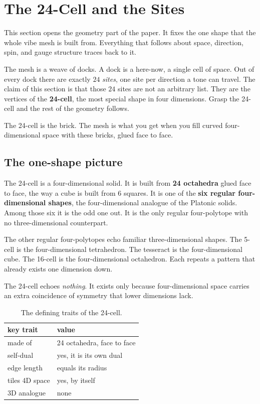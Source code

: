 \section{The 24-Cell and the Sites}

This section opens the geometry part of the paper. It fixes the one shape that the whole vibe mesh is built from. Everything that follows about space, direction, spin, and gauge structure traces back to it.

The mesh is a weave of docks. A dock is a here-now, a single cell of space. Out of every dock there are exactly $24$ \emph{sites}, one site per direction a tone can travel. The claim of this section is that those $24$ sites are not an arbitrary list. They are the vertices of the \textbf{24-cell}, the most special shape in four dimensions. Grasp the 24-cell and the rest of the geometry follows.

\begin{principle}
The 24-cell is the brick. The mesh is what you get when you fill curved four-dimensional space with these bricks, glued face to face.
\end{principle}

\subsection{The one-shape picture}

The 24-cell is a four-dimensional solid. It is built from \textbf{24 octahedra} glued face to face, the way a cube is built from $6$ squares. It is one of the \textbf{six regular four-dimensional shapes}, the four-dimensional analogue of the Platonic solids. Among those six it is the odd one out. It is the only regular four-polytope with no three-dimensional counterpart.

The other regular four-polytopes echo familiar three-dimensional shapes. The 5-cell is the four-dimensional tetrahedron. The tesseract is the four-dimensional cube. The 16-cell is the four-dimensional octahedron. Each repeats a pattern that already exists one dimension down.

The 24-cell echoes \emph{nothing}. It exists only because four-dimensional space carries an extra coincidence of symmetry that lower dimensions lack.

\begin{table}[ht]
\centering
\begin{tabular}{@{}ll@{}}
\toprule
key trait & value \\
\midrule
made of & 24 octahedra, face to face \\
self-dual & yes, it is its own dual \\
edge length & equals its radius \\
tiles 4D space & yes, by itself \\
3D analogue & none \\
\bottomrule
\end{tabular}
\caption{The defining traits of the 24-cell.}
\label{tab:24cell-traits}
\end{table}

